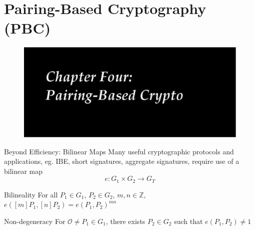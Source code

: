 \documentclass{beamer}
\begin{document}
\section{Pairing-Based Cryptography (PBC)}
\begin{frame}{}
\begin{figure}[htbp]
\centering
  \includegraphics[width=\textwidth]{img/chap4-pbc.pdf}
\end{figure}
\end{frame}

\begin{frame}{Beyond Efficiency: Bilinear Maps}
Many useful cryptographic protocols and applications, eg. IBE, short 
signatures, aggregate signatures, require use of a bilinear map
$$e: G_1 \times G_2 \rightarrow G_T$$

\begin{block}{Bilineality}
For all $P_1\in G_1$, $P_2 \in G_2$, $m, n\in \mathbb{Z}$, 
$e([m]P_1,[n]P_2) = e(P_1, P_2)^{mn}$
\end{block}

\begin{block}{Non-degeneracy}
For $\mathcal{O}\ne P_1\in G_1$, there exists $P_2\in G_2$ such that
$e(P_1, P_2) \ne 1$
\end{block}
\end{frame}

%

\end{document}
